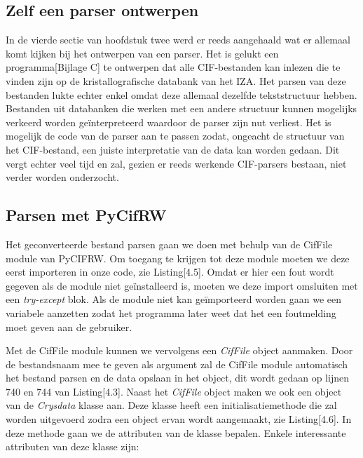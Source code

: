 \subsection{Zelf een parser ontwerpen}
In de vierde sectie van hoofdstuk twee werd er reeds aangehaald wat er allemaal komt kijken bij het ontwerpen van een parser. Het is gelukt een programma[Bijlage C] te ontwerpen dat alle CIF-bestanden kan inlezen die te vinden zijn op de kristallografische databank van het IZA.\citep*{IZA1} Het parsen van deze bestanden lukte echter enkel omdat deze allemaal dezelfde tekststructuur hebben. Bestanden uit databanken die werken met een andere structuur kunnen mogelijks verkeerd worden geïnterpreteerd waardoor de parser zijn nut verliest. Het is mogelijk de code van de parser aan te passen zodat, ongeacht de structuur van het CIF-bestand, een juiste interpretatie van de data kan worden gedaan. Dit vergt echter veel tijd en zal, gezien er reeds werkende CIF-parsers bestaan, niet verder worden onderzocht.



\subsection{Parsen met PyCifRW}
Het geconverteerde bestand parsen gaan we doen met behulp van de CifFile module van PyCIFRW. Om toegang te krijgen tot deze module moeten we deze eerst importeren in onze code, zie Listing[4.5]. Omdat er hier een fout wordt gegeven als de module niet geïnstalleerd is, moeten we deze import omsluiten met een \textit{try-except} blok. Als de module niet kan geïmporteerd worden gaan we een variabele aanzetten zodat het programma later weet dat het een foutmelding moet geven aan de gebruiker.



Met de CifFile module kunnen we vervolgens een \textit{CifFile} object aanmaken. Door de bestandsnaam mee te geven als argument zal de CifFile module automatisch het bestand parsen en de data opslaan in het object, dit wordt gedaan op lijnen 740 en 744 van Listing[4.3]. Naast het \textit{CifFile} object maken we ook een object van de \textit{Crysdata} klasse aan. Deze klasse heeft een initialisatiemethode die zal worden uitgevoerd zodra een object ervan wordt aangemaakt, zie Listing[4.6]. In deze methode gaan we de attributen van de klasse bepalen. Enkele interessante attributen van deze klasse zijn:

